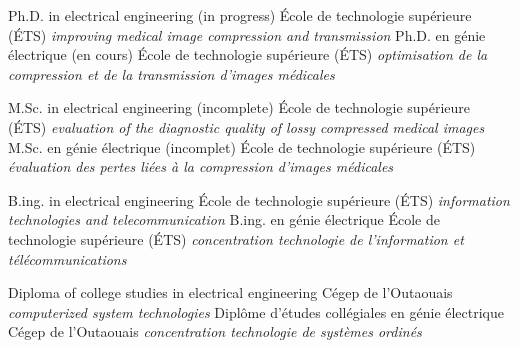\documentclass[print]{friggeri-cv}
\begin{document}


\begin{entrylist}
  \engfr
  { {Ph.D. in electrical engineering (in progress)} {École de technologie supérieure {\scriptsize (ÉTS)}} {\emph{improving medical image compression and transmission}}}
  { {Ph.D. en génie électrique (en cours)} {École de technologie supérieure {\scriptsize (ÉTS)}} {\emph{optimisation de la compression et de la transmission d'images médicales}}}

  \engfr
  { {M.Sc. in electrical engineering (incomplete\textsuperscript{\tiny\textdaggerdbl})} {École de technologie supérieure {\scriptsize (ÉTS)}} {\emph{evaluation of the diagnostic quality of lossy compressed medical images}}}
  { {M.Sc. en génie électrique (incomplet\textsuperscript{\tiny\textdaggerdbl})} {École de technologie supérieure {\scriptsize (ÉTS)}} {\emph{évaluation des pertes liées à la compression d'images médicales}}}

  \engfr
  { {B.ing. in electrical engineering} {École de technologie supérieure {\scriptsize (ÉTS)}} {\emph{information technologies and telecommunication}}}
  { {B.ing. en génie électrique} {École de technologie supérieure {\scriptsize (ÉTS)}} {\emph{concentration technologie de l'information et télécommunications}}}

  \engfr
  { {Diploma of college studies in electrical engineering} {Cégep de l’Outaouais} {\emph{computerized system technologies}}}
  { {Diplôme d'études collégiales en génie électrique} {Cégep de l’Outaouais} {\emph{concentration technologie de systèmes ordinés}}}
\end{entrylist}


\end{document}
